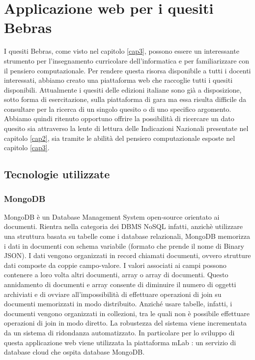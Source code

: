 \documentclass[12pt]{report}
\begin{document}
\chapter{Applicazione web per i quesiti Bebras} \label{Applicazione} 
I quesiti Bebras, come visto nel capitolo \ref{cap3}, possono essere un interessante strumento per l'insegnamento curricolare dell'informatica e per familiarizzare con il pensiero computazionale. Per rendere questa risorsa disponibile a tutti i docenti interessati, abbiamo creato una piattaforma web che raccoglie tutti i quesiti disponibili.
Attualmente i quesiti delle edizioni italiane sono già a disposizione, sotto forma di esercitazione, sulla piattaforma di gara \cite{PiattaformaBebras} ma essa risulta difficile da consultare per la ricerca di un singolo quesito o di uno specifico argomento.
Abbiamo quindi ritenuto opportuno offrire la possibilità di ricercare un dato quesito sia attraverso la lente di lettura delle Indicazioni Nazionali presentate nel capitolo \ref{cap2}, sia tramite le abilità del pensiero computazionale esposte nel capitolo \ref{cap3}.
\section{Tecnologie utilizzate}

\subsection{MongoDB}
MongoDB \cite{mongoDB}è un Database Management System open-source orientato ai documenti. Rientra nella categoria dei DBMS NoSQL infatti, anzichè utilizzare una struttura basata su tabelle come i database relazionali, MongoDB memorizza i dati in documenti con schema variabile (formato che prende il nome di Binary JSON). 
I dati vengono organizzati in record chiamati documenti, ovvero strutture dati composte da coppie campo-valore. I valori associati ai campi possono contenere a loro volta altri documenti, array o array di documenti.
Questo annidamento di documenti e array consente di diminuire il numero di oggetti archiviati e di ovviare all'impossibilità di effettuare operazioni di join su documenti memorizzati in modo distribuito. Anziché usare tabelle, infatti, i documenti vengono organizzati in collezioni, tra le quali non è possibile effettuare operazioni di join in modo diretto. La robustezza del sistema viene incrementata da un sistema di ridondanza automatizzato. 
In particolare per lo sviluppo di questa applicazione web viene utilizzata la piattaforma mLab \cite{mLab}: un servizio di database cloud che ospita database MongoDB.
\end{document}
